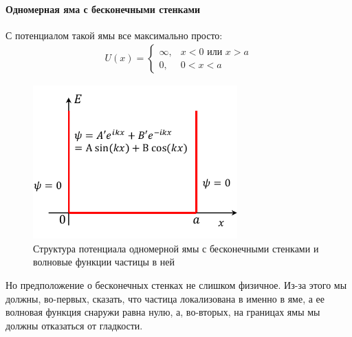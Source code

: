 \documentclass[12pt]{article}
\begin{document}
\paragraph{Одномерная яма с бесконечными стенками}
С потенциалом такой ямы все максимально просто:
\begin{gather*}
    U(x) = \begin{cases}
         \infty, &x<0 \text{ или } x>a \\
          0, &0<x<a 
    \end{cases}
\end{gather*}
\begin{figure}[h]
    \centering
    \includegraphics[width=0.7\textwidth,height=\textheight,keepaspectratio]{Seminar_04/pics/pic_03.pdf}
    \caption{Структура потенциала одномерной ямы с бесконечными стенками и волновые функции частицы в ней}
    \label{fig:sem_04_1D_inf_hole}
\end{figure}
Но предположение о бесконечных стенках не слишком физичное. Из-за этого мы должны, во-первых, сказать, что частица локализована в именно в яме, а ее волновая функция снаружи равна нулю, а, во-вторых, на границах ямы мы должны отказаться от гладкости.
\end{document}

